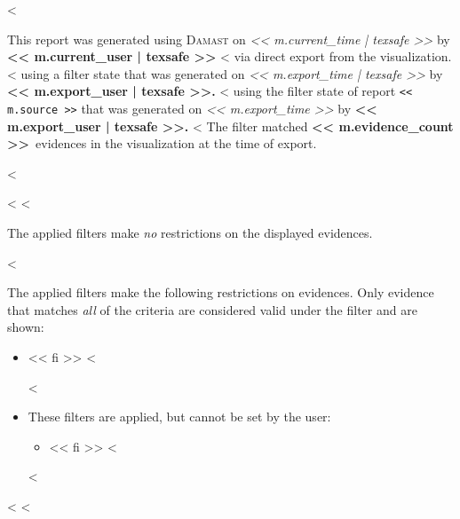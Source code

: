 <%

This report was generated using \textsc{Damast} on
\emph{<< m.current_time | texsafe >>}
by \textbf{<< m.current_user | texsafe >>}
  <%
  via direct export from the visualization.
  <%
  using a filter state that was generated on
  \emph{<< m.export_time | texsafe >>}
  by
  \textbf{<< m.export_user | texsafe >>.}
  <%
  using the filter state of report \texttt{<< m.source >>}
  that was generated on
  \emph{<< m.export_time >>}
  by
  \textbf{<< m.export_user | texsafe >>.}
  <%
  The filter matched
  \textbf{<< m.evidence_count >>}~evidences
  in the visualization at the time of export.

<%


<%
<%

The applied filters make \emph{no} restrictions on the displayed evidences.

<%

The applied filters make the following restrictions on evidences.
Only evidence that matches \emph{all} of the criteria are considered valid under the filter and are shown:

\begin{itemize}
  <%
  \item << fi >>
  <%

  <%
  \item These filters are applied, but cannot be set by the user:
    \begin{itemize}
      <%
      \item << fi >>
      <%
    \end{itemize}
  <%
\end{itemize}
<%
<%

